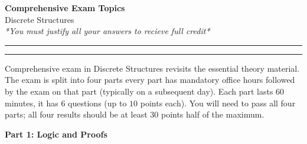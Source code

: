 \documentclass[a4paper,12pt]{article}
\begin{document}
\begin{center}
{\bf\Huge Comprehensive Exam Topics} \\[5pt]
Discrete Structures \\
\textit{*You must justify all your answers to recieve full credit*}
\end{center}

\hrule
\vspace{2pt}
\hrule
\vspace{12pt}

Comprehensive exam in Discrete Structures revisits the essential theory material. 
The exam is split into four parts \textendash{} every part has mandatory office hours 
followed by the exam on that part (typically on a subsequent day). 
Each part lasts $60$ minutes, it has $6$ questions (up to $10$ points each). 
You will need to pass all four parts; 
all four results should be at least $30$ points  \textendash{} half of the maximum.


\vspace{10pt}
{\bf Part 1: Logic and Proofs}
\end{document}
